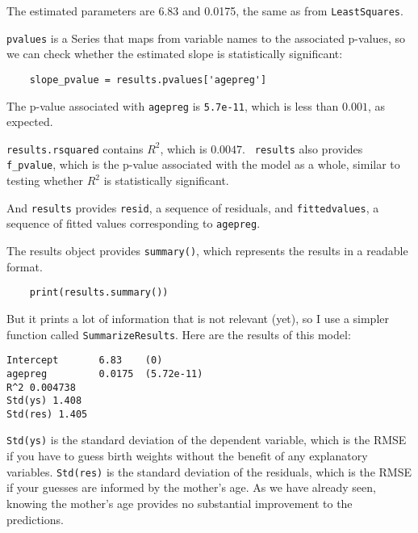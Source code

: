 \documentclass[12pt]{book}
\begin{document}
The estimated parameters are 6.83 and 0.0175, the same as
from {\tt LeastSquares}.

{\tt pvalues} is a Series that maps from variable names to the associated
p-values, so we can check whether the estimated slope is statistically
significant:
   

\begin{verbatim}
    slope_pvalue = results.pvalues['agepreg']
\end{verbatim}

The p-value associated with {\tt agepreg} is {\tt 5.7e-11}, which
is less than $0.001$, as expected.

{\tt results.rsquared} contains $R^2$, which is $0.0047$.  {\tt
  results} also provides \verb"f_pvalue", which is the p-value
associated with the model as a whole, similar to testing whether $R^2$
is statistically significant.

And {\tt results} provides {\tt resid}, a sequence of residuals, and
{\tt fittedvalues}, a sequence of fitted values corresponding to
{\tt agepreg}.

The results object provides {\tt summary()}, which
represents the results in a readable format.  

\begin{verbatim}
    print(results.summary())
\end{verbatim}

But it prints a lot of information that is not relevant (yet), so
I use a simpler function called {\tt SummarizeResults}.  Here are
the results of this model:

\begin{verbatim}
Intercept       6.83    (0)
agepreg         0.0175  (5.72e-11)
R^2 0.004738
Std(ys) 1.408
Std(res) 1.405
\end{verbatim}

{\tt Std(ys)} is the standard deviation of the dependent variable,
which is the RMSE if you have to guess birth weights without the benefit of
any explanatory variables.  {\tt Std(res)} is the standard deviation
of the residuals, which is the RMSE if your guesses are informed
by the mother's age.  As we have already seen, knowing the mother's
age provides no substantial improvement to the predictions.
\end{document}
